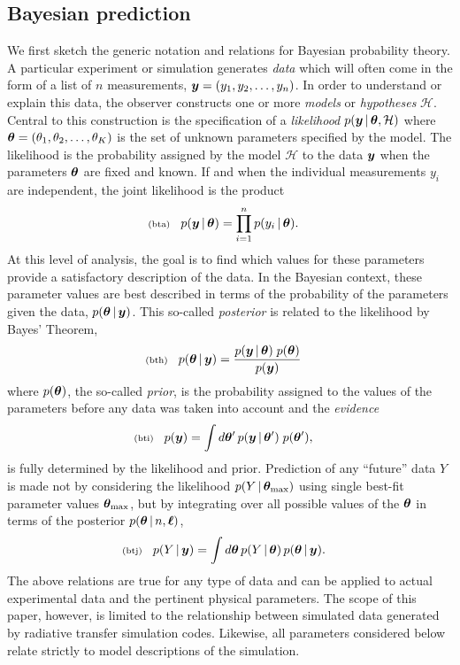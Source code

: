 \documentclass[11pt]{article}
\newcommand{\lleq}[1]{\label{#1} }
\renewcommand{\lleq}[1]{\label{#1} {\scriptstyle {\rm (#1)}} \hspace*{2ex} }
\newcommand{\hypo}  {{\mathcal{H}}}  %
\newcommand{\cond}{\,|\,}
\begin{document}
\subsection{Bayesian prediction}
\label{sec:bayp}

We first sketch the generic notation and relations for Bayesian
probability theory.
%
A particular experiment or simulation generates
\textit{data}
which will often come in the form of a list of $n$ measurements,
${\bm{y}} = (y_1,y_2,\ldots,y_n)$. In order to understand or explain this
data, the observer constructs one or more \textit{models} or
\textit{hypotheses} $\hypo$. Central to this construction is the
specification of a \textit{likelihood} $p(\bmy\cond \bmtheta,\hypo)$
where ${\bm{\theta}} = (\theta_1,\theta_2,\ldots,\theta_K)$ is the set of
unknown parameters specified by the model. The likelihood is the
probability assigned by the model $\hypo$ to the data ${\bm{y}}$ when the
parameters ${\bm{\theta}}$ are fixed and known.
% 
If and when the individual measurements $y_i$ are independent, the
joint likelihood is the product
\begin{align}
  \lleq{bta}
  p(\bmy\cond \bmtheta) &= \prod_{i=1}^n p(y_i\cond \bmtheta).
\end{align}
At this level of analysis, the goal is to find which values for these
parameters provide a satisfactory description of the data. In the
Bayesian context, these parameter values are best described in terms
of the probability of the parameters given the data,
$p(\bmtheta\cond \bmy)$. This so-called \textit{posterior} is related
to the likelihood by Bayes' Theorem,
\begin{align}
  \lleq{bth}
  p(\bmtheta\cond \bmy)
  &= \frac{p(\bmy\cond\bmtheta)\;p(\bmtheta)}
    {p(\bmy)}
\end{align}
where $p({\bm{\theta}})$, the so-called \textit{prior}, is the probability
assigned to the values of the parameters before any data was taken
into account and the \textit{evidence}
\begin{align}
  \lleq{bti}
  p(\bmy) &= \int d\bmtheta'\, p(\bmy\cond\bmtheta')\;p(\bmtheta'),
\end{align}
is fully determined by the likelihood and prior. 
% 
Prediction of any ``future'' data $Y$ is made not by considering the
likelihood $p(Y\cond\bmtheta_{\rm max})$ using single best-fit
parameter values ${\bm{\theta}}_{\rm max}$, but by integrating over all
possible values of the ${\bm{\theta}}$ in terms of the posterior
$p(\bmtheta\cond n,\bml)$,
\begin{align}
  \lleq{btj}
  p(Y\cond \bmy) &= \int d\bmtheta\,p(Y\cond\bmtheta)\,p(\bmtheta\cond \bmy).
\end{align}
The above relations are true for any type of data and can be applied
to actual experimental data and the pertinent physical parameters. The
scope of this paper, however, is limited to the relationship between
simulated data generated by radiative transfer simulation codes.
Likewise, all parameters considered below relate strictly to model
descriptions of the simulation.
\end{document}
